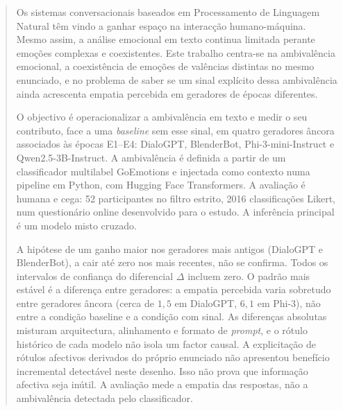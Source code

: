 \begin{abstract}

Os sistemas conversacionais baseados em Processamento de Linguagem Natural têm vindo a ganhar espaço na interacção humano-máquina. Mesmo assim, a análise emocional em texto continua limitada perante emoções complexas e coexistentes. Este trabalho centra-se na ambivalência emocional, a coexistência de emoções de valências distintas no mesmo enunciado, e no problema de saber se um sinal explícito dessa ambivalência ainda acrescenta empatia percebida em geradores de épocas diferentes.

O objectivo é operacionalizar a ambivalência em texto e medir o seu contributo, face a uma \textit{baseline} sem esse sinal, em quatro geradores âncora associados às épocas E1--E4: DialoGPT, BlenderBot, Phi-3-mini-Instruct e Qwen2.5-3B-Instruct. A ambivalência é definida a partir de um classificador multilabel GoEmotions e injectada como contexto numa pipeline em Python, com Hugging Face Transformers. A avaliação é humana e cega: 52 participantes no filtro estrito, 2016 classificações Likert, num questionário online desenvolvido para o estudo. A inferência principal é um modelo misto cruzado.

A hipótese de um ganho maior nos geradores mais antigos (DialoGPT e BlenderBot), a cair até zero nos mais recentes, não se confirma. Todos os intervalos de confiança do diferencial \(\Delta\) incluem zero. O padrão mais estável é a diferença entre geradores: a empatia percebida varia sobretudo entre geradores âncora (cerca de \(1{,}5\) em DialoGPT, \(6{,}1\) em Phi-3), não entre a condição baseline e a condição com sinal. As diferenças absolutas misturam arquitectura, alinhamento e formato de \textit{prompt}, e o rótulo histórico de cada modelo não isola um factor causal. A explicitação de rótulos afectivos derivados do próprio enunciado não apresentou benefício incremental detectável neste desenho. Isso não prova que informação afectiva seja inútil. A avaliação mede a empatia das respostas, não a ambivalência detectada pelo classificador.

\end{abstract}

